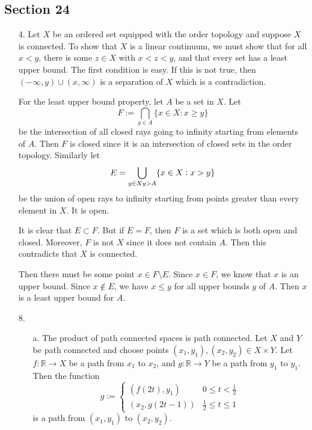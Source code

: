 \documentclass[11pt, reqno]{article}
\theoremstyle{plain}
\theoremstyle{definition}
\theoremstyle{remark}
\newcommand{\RR}{\mathbb{R}}
\begin{document}
\subsection*{Section 24}

\begin{enumerate}
    \item[4.] Let $X$ be an ordered set equipped with the order topology and suppose $X$ is connected. To show that $X$ is a 
    linear continuum, we must show that for all $x < y$, there is some $z \in X$ with $x < z < y$, and that 
    every set has a least upper bound. 
    \bigbreak
    The first condition is easy. If this is not true, then $(-\infty, y)\cup(x, \infty)$ is a separation of $X$ which is a 
    contradiction. 

    For the least upper bound property, let $A$ be a set in $X$. Let 
    \[
        F := \bigcap_{y \in A}\{x \in X: x \geq y\}
    \]
    be the intersection of all closed rays going to infinity starting from elements of $A$. Then $F$ is closed 
    since it is an intersection of closed sets in the order topology. 
    Similarly let 
    \[
        E = \bigcup\limits_{y \in X\\ y > A} \{x \in X: x > y\}
    \]
    be the union of open rays to infinity starting from points greater than every element in $X$. It is open.

    It is clear that $E \subset F$. But if $E = F$, then $F$ is a set which is both open and closed. Moreover,
    $F$ is not $X$ since it does not contain $A$. Then this contradicts that $X$ is connected. 

    Then there must be some point $x \in F \setminus E$. Since $x \in F$, we know that $x$ is an upper bound. 
    Since $x \notin E$, we have $x \leq y$ for all upper bounds $y$ of $A$. Then $x$ is a least upper bound for $A$.

    \item[8.] 
    \begin{enumerate}
        \item[a.] The product of path connected spaces is path connected. Let $X$ and $Y$ be path connected and 
        choose points $(x_1, y_1), (x_2, y_2) \in X \times Y$. Let $f: \RR \rightarrow X$ be a path from $x_1$
        to $x_2$, and $g: \RR \rightarrow Y$ be a path from $y_1$ to $y_1$. Then the function
        \[
            g := \begin{cases} (f(2t), y_1) & 0 \leq t < \frac{1}{2}\\ (x_2, g(2t-1)) & \frac{1}{2} \leq t \leq 1\end{cases}
        \]
        is a path from $(x_1, y_1)$ to $(x_2, y_2)$.


\end{enumerate}
\end{enumerate}
\end{document}
